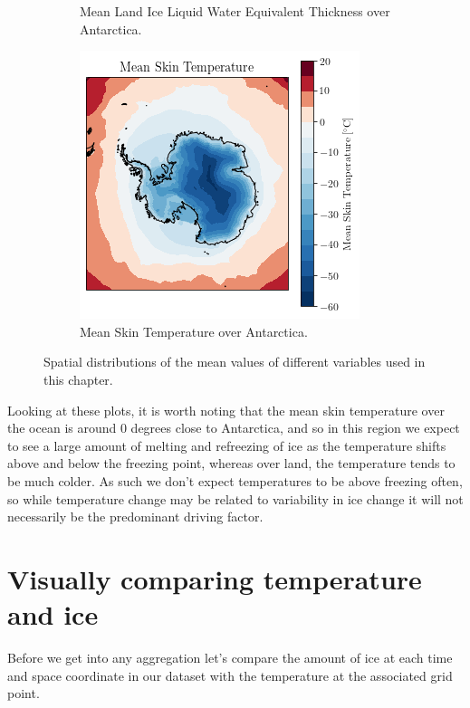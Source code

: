 \documentclass[../main.tex]{subfiles}
\begin{document}
\begin{figure}[H]
\begin{subfigure}[h!]{0.49\textwidth}
\caption{Mean Land Ice Liquid Water Equivalent Thickness over Antarctica.}
\end{subfigure}
\begin{subfigure}[h!]{0.49\textwidth}
\includegraphics[width=\textwidth]{images/week8/lres/mean_skt_distribution}
\caption{Mean Skin Temperature over Antarctica.}
\end{subfigure}
\caption{Spatial distributions of the mean values of different variables used in this chapter.}
\label{fig:mean_distributions}
\end{figure}

Looking at these plots, it is worth noting that the mean skin temperature over the ocean is around 0 degrees close to Antarctica, and so in this region we expect to see a large amount of melting and refreezing of ice as the temperature shifts above and below the freezing point, whereas over land, the temperature tends to be much colder. As such we don't expect temperatures to be above freezing often, so while temperature change may be related to variability in ice change it will not necessarily be the predominant driving factor. 


\section{Visually comparing temperature and ice}
Before we get into any aggregation let's compare the amount of ice at each time and space coordinate in our dataset with the temperature at the associated grid point. 
\end{document}
